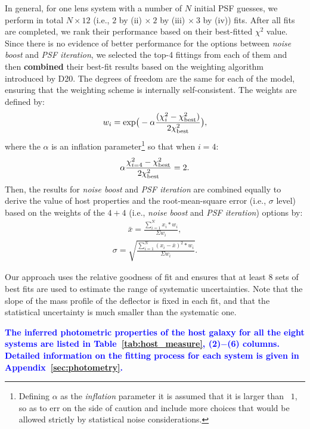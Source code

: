 \documentclass[fleqn,usenatbib]{mnras}
\newcommand{\blue}[1]{{\bf \textcolor{blue}{#1}}}
\begin{document}
In general, for one lens system with a number of $N$ initial PSF guesses, we perform in total $N\times12$ (i.e., $2$ by (ii) $\times~2$ by (iii) $\times~3$ by (iv)) fits. After all fits are completed, we rank their performance based on their best-fitted $\chi^2$ value. Since there is no evidence of better performance for the options between {\it noise boost} and {\it PSF iteration}, we selected the top-4 fittings from each of them and then {\bf combined} their best-fit results based on the weighting algorithm introduced by D20. The degrees of freedom are the same for each of the model, ensuring that the weighting scheme is internally self-consistent. The weights are defined by:
\begin{eqnarray}
\label{eq:weights}
w_i = {\rm exp} \big(- \alpha \frac{ (\chi_i ^2 - \chi_{\rm best} ^2 )}{2 \chi_{\rm best} ^2} \big),
\end{eqnarray} 
where the $\alpha$ is an inflation parameter\footnote{Defining $\alpha$ as the {\it inflation} parameter it is assumed that it is larger than ~$1$, so as to err on the side of caution and include more choices that would be allowed strictly by statistical noise considerations.} so that when $i=4$:
\begin{eqnarray}
\label{eq:alpha}
\alpha \frac{ \chi_{i=4} ^2 - \chi_{\rm best} ^2 }{2 \chi_{\rm best} ^2} = 2.
\end{eqnarray} 
Then, the results for {\it noise boost} and {\it PSF iteration} are combined equally to derive the value of host properties and the root-mean-square error (i.e., $\sigma$ level) based on the weights of the $4+4$ (i.e., {\it noise boost} and {\it PSF iteration}) options by:
\begin{eqnarray}
\label{eq:infer_value}
\bar{x}  =  \frac{  \sum_{i=1}^{N}   x_i * w_i  }{\Sigma w_i} ,
\end{eqnarray} 
\begin{eqnarray}
\label{eq:infer_scatter}
\sigma =   \sqrt{ \frac{  \sum_{i=1}^{N}   (x_i -  \bar{x} ) ^2 * w_i  }{\Sigma w_i} }.
\end{eqnarray} 

Our approach uses the relative goodness of fit and ensures that at least 8 sets of best fits are used to estimate the range of systematic uncertainties. Note that the slope of the mass profile of the deflector is fixed in each fit, and that the statistical uncertainty is much smaller than the systematic one. 

\blue{The inferred photometric properties of the host galaxy for all the eight systems are listed in Table~\ref{tab:host_measure}, (2)$-$(6) columns. Detailed information on the fitting process for each system is given in Appendix~\ref{sec:photometry}.}
\end{document}
